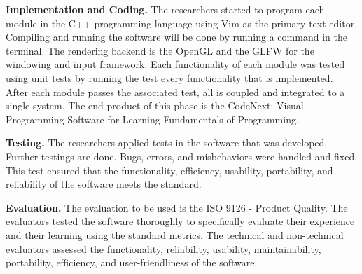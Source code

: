 \flushleft
\textbf{Implementation and Coding.}
\justifying
\parx
The researchers started to program each module in the C++ programming
language using Vim as the primary text editor. Compiling and running the
software will be done by running a command in the terminal. The rendering
backend is the OpenGL and the GLFW for the windowing and input framework. Each
functionality of each module was tested using unit tests by running the
test every functionality that is implemented. After each module passes
the associated test, all is coupled and integrated to a single system. The
end product of this phase is the CodeNext: Visual Programming Software for
Learning Fundamentals of Programming.

\flushleft
\textbf{Testing.}
\justifying
\parx
The researchers applied tests in the software that was developed.
Further testings are done. Bugs, errors, and misbehaviors were handled
and fixed. This test ensured that the functionality, efficiency,
usability, portability, and reliability of the software meets the standard.

\flushleft
\textbf{Evaluation.}
\justifying
\parx
The evaluation to be used is the ISO 9126 - Product Quality. The evaluators
tested the software thoroughly to specifically evaluate their experience and
their learning using the standard metrics. The technical and non-technical
evaluators assessed the functionality, reliability, usability, maintainability,
portability, efficiency, and user-friendliness of the software.
